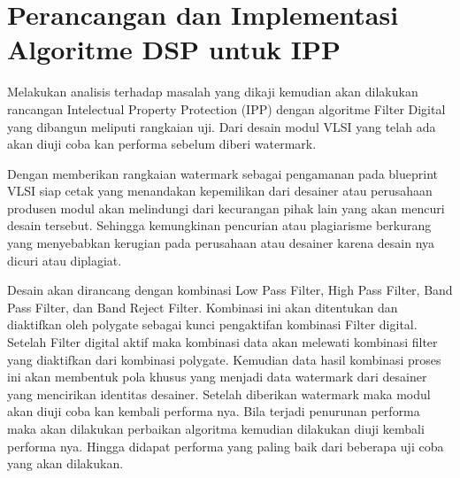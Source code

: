 \section{Perancangan dan Implementasi Algoritme DSP untuk IPP}

Melakukan analisis terhadap masalah yang dikaji kemudian akan
dilakukan rancangan Intelectual Property Protection (IPP) dengan algoritme Filter
Digital yang dibangun meliputi rangkaian uji. Dari desain modul VLSI yang telah
ada akan diuji coba kan performa sebelum diberi watermark.

Dengan memberikan rangkaian watermark sebagai pengamanan pada
blueprint VLSI siap cetak yang menandakan kepemilikan dari desainer atau
perusahaan produsen modul akan melindungi dari kecurangan pihak lain yang
akan mencuri desain tersebut. Sehingga kemungkinan pencurian atau plagiarisme
berkurang yang menyebabkan kerugian pada perusahaan atau desainer karena
desain nya dicuri atau diplagiat.

Desain akan dirancang dengan kombinasi Low Pass Filter, High Pass
Filter, Band Pass Filter, dan Band Reject Filter. Kombinasi ini akan ditentukan
dan diaktifkan oleh polygate sebagai kunci pengaktifan kombinasi Filter digital.
Setelah Filter digital aktif maka kombinasi data akan melewati kombinasi filter
yang diaktifkan dari kombinasi polygate. Kemudian data hasil kombinasi proses
ini akan membentuk pola khusus yang menjadi data watermark dari desainer yang
mencirikan identitas desainer. Setelah diberikan watermark maka modul akan
diuji coba kan kembali performa nya. Bila terjadi penurunan performa maka akan
dilakukan perbaikan algoritma kemudian dilakukan diuji kembali performa nya.
Hingga didapat performa yang paling baik dari beberapa uji coba yang akan
dilakukan.
